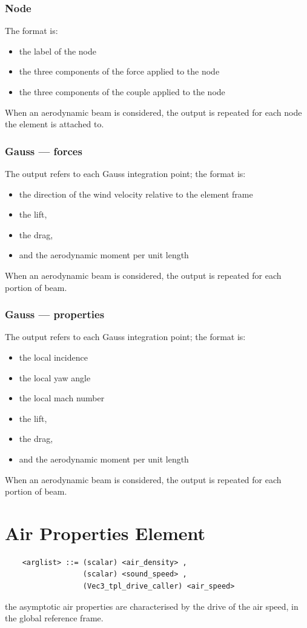 \subsubsection{Node}
The format is:
\begin{itemize}
    \item the label of the node
    \item the three components of the force applied to the node
    \item the three components of the couple applied to the node
\end{itemize}
When an aerodynamic beam is considered, the output is repeated for each node
the element is attached to.

\subsubsection{Gauss --- forces}
The output refers to each Gauss integration point; the format is:
\begin{itemize}
    \item the direction of the wind velocity relative to the element frame
    \item the lift,
    \item the drag,
    \item and the aerodynamic moment per unit length
\end{itemize}
When an aerodynamic beam is considered, the output is repeated for each
portion of beam.

\subsubsection{Gauss --- properties}
The output refers to each Gauss integration point; the format is:
\begin{itemize}
    \item the local incidence
    \item the local yaw angle
    \item the local mach number
    \item the lift,
    \item the drag,
    \item and the aerodynamic moment per unit length
\end{itemize}
When an aerodynamic beam is considered, the output is repeated for each
portion of beam.






\section{Air Properties Element}
\begin{verbatim}
    <arglist> ::= (scalar) <air_density> , 
                  (scalar) <sound_speed> ,
                  (Vec3_tpl_drive_caller) <air_speed>
\end{verbatim}
the asymptotic air properties are characterised by the drive of the 
air speed, in the global reference frame.





